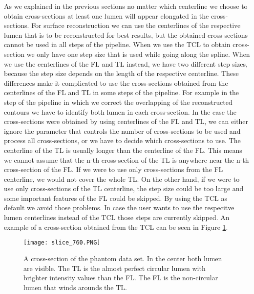 \documentclass[thesis.tex]{subfiles}
\begin{document}
As we explained in the previous sections no matter which centerline we choose to obtain cross-sections at least one lumen will appear elongated in the cross-sections. For surface reconstruction we can use the centerlines of the respective lumen that is to be reconstructed for best results, but the obtained cross-sections cannot be used in all steps of the pipeline. 
When we use the TCL to obtain cross-section we only have one step size that is used while going along the spline. When we use the centerlines of the FL and TL instead, we have two different step sizes, because the step size depends on the length of the respective centerline. These differences make it complicated to use the cross-sections obtained from the centerlines of the FL and TL in some steps of the pipeline. For example in the step of the pipeline in which we correct the overlapping of the reconstructed contours we have to identify both lumen in each cross-section. In the case the cross-sections were obtained by using centerlines of the FL and TL, we can either ignore the parameter that controls the number of cross-sections to be used and process all cross-sections, or we have to decide which cross-sections to use.
The centerline of the TL is usually longer than the centerline of the FL. This means we cannot assume that the n-th cross-section of the TL is anywhere near the n-th cross-section of the FL. If we were to use only cross-sections from the FL centerline, we would not cover the whole TL. On the other hand, if we were to use only cross-sections of the TL centerline, the step size could be too large and some important features of the FL could be skipped. By using the TCL as default we avoid those problems. In case the user wants to use the respecitve lumen centerlines instead of the TCL those steps are currently skipped. An example of a cross-section obtained from the TCL can be seen in Figure \ref{fig:cross-section}.

\begin{figure}[h]
\centering
\texttt{[image: slice\_760.PNG]}
\caption{A cross-section of the phantom data set. In the center both lumen are visible. The TL is the almost perfect circular lumen with brighter intensity values than the FL. The FL is the non-circular lumen that winds arounds the TL.}
\label{fig:cross-section}
\end{figure}  

\end{document}
